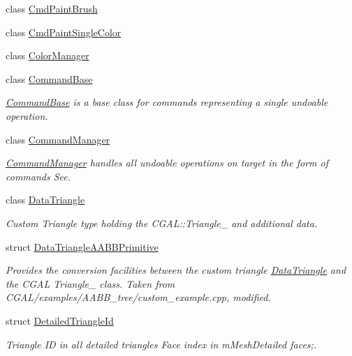 \begin{DoxyCompactItemize}
class \mbox{\hyperlink{classpepr3d_1_1_cmd_paint_brush}{Cmd\+Paint\+Brush}}
\item 
class \mbox{\hyperlink{classpepr3d_1_1_cmd_paint_single_color}{Cmd\+Paint\+Single\+Color}}
\item 
class \mbox{\hyperlink{classpepr3d_1_1_color_manager}{Color\+Manager}}
\item 
class \mbox{\hyperlink{classpepr3d_1_1_command_base}{Command\+Base}}
\begin{DoxyCompactList}\small\item\em \mbox{\hyperlink{classpepr3d_1_1_command_base}{Command\+Base}} is a base class for commands representing a single undoable operation. \end{DoxyCompactList}\item 
class \mbox{\hyperlink{classpepr3d_1_1_command_manager}{Command\+Manager}}
\begin{DoxyCompactList}\small\item\em \mbox{\hyperlink{classpepr3d_1_1_command_manager}{Command\+Manager}} handles all undoable operations on target in the form of commands See. \end{DoxyCompactList}\item 
class \mbox{\hyperlink{classpepr3d_1_1_data_triangle}{Data\+Triangle}}
\begin{DoxyCompactList}\small\item\em Custom Triangle type holding the C\+G\+A\+L\+::\+Triangle\+\_ and additional data. \end{DoxyCompactList}\item 
struct \mbox{\hyperlink{structpepr3d_1_1_data_triangle_a_a_b_b_primitive}{Data\+Triangle\+A\+A\+B\+B\+Primitive}}
\begin{DoxyCompactList}\small\item\em Provides the conversion facilities between the custom triangle \mbox{\hyperlink{classpepr3d_1_1_data_triangle}{Data\+Triangle}} and the C\+G\+AL Triangle\+\_ class. Taken from C\+G\+A\+L/examples/\+A\+A\+B\+B\+\_\+tree/custom\+\_\+example.\+cpp, modified. \end{DoxyCompactList}\item 
struct \mbox{\hyperlink{structpepr3d_1_1_detailed_triangle_id}{Detailed\+Triangle\+Id}}
\begin{DoxyCompactList}\small\item\em Triangle ID in all detailed triangles Face index in m\+Mesh\+Detailed faces;. \end{DoxyCompactList}\item 

\end{DoxyCompactItemize}
